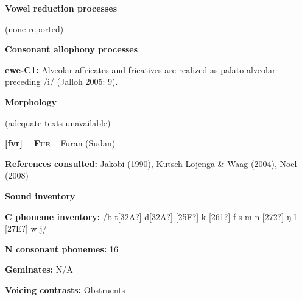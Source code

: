 \begin{styleBody}
\textbf{Vowel reduction processes}
\end{styleBody}

\begin{styleBody}
(none reported)
\end{styleBody}

\begin{styleBody}
\textbf{Consonant allophony processes}
\end{styleBody}

\begin{styleBody}
\textbf{ewe-C1: }Alveolar affricates and fricatives are realized as palato-alveolar preceding /i/ (Jalloh 2005: 9).
\end{styleBody}

\begin{styleBody}
\textbf{Morphology}
\end{styleBody}

\begin{styleBody}
(adequate texts unavailable)
\end{styleBody}

\clearpage\begin{styleBody}
\textbf{[fvr] }\ \ \textbf{\textsc{Fur}}\textbf{\ \ }Furan (Sudan)
\end{styleBody}

\begin{styleBody}
\textbf{References consulted: }Jakobi (1990), Kutsch Lojenga \& Waag (2004), Noel (2008)
\end{styleBody}

\begin{styleBody}
\textbf{Sound inventory}
\end{styleBody}

\begin{styleBody}
\textbf{C phoneme inventory:} /b t[32A?] d[32A?] [25F?] k [261?] f s m n [272?] ŋ l [27E?] w j/
\end{styleBody}

\begin{styleBody}
\textbf{N consonant phonemes:} 16
\end{styleBody}

\begin{styleBody}
\textbf{Geminates:} N/A
\end{styleBody}

\begin{styleBody}
\textbf{Voicing contrasts:} Obstruents
\end{styleBody}

